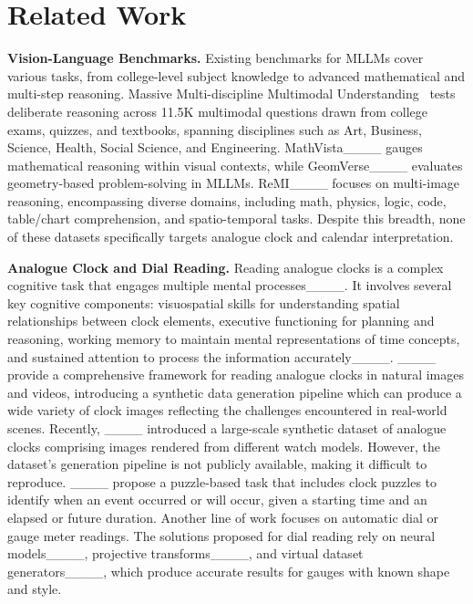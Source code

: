 \section{Related Work}
\label{sec:related}
% 
\textbf{Vision-Language Benchmarks.} Existing benchmarks for MLLMs cover various tasks, from college-level subject knowledge to advanced mathematical and multi-step reasoning.
%
Massive Multi-discipline Multimodal Understanding~\cite[MMMU, ][]{Yue_2024_CVPR} tests deliberate reasoning across 11.5K multimodal questions drawn from college exams, quizzes, and textbooks, spanning disciplines such as Art, Business, Science, Health, Social Science, and Engineering.
%
MathVista____ gauges mathematical reasoning within visual contexts, while GeomVerse____ evaluates geometry-based problem-solving in MLLMs.
%
ReMI____ focuses on multi-image reasoning, encompassing diverse domains, including math, physics, logic, code, table/chart comprehension, and spatio-temporal tasks.
%
Despite this breadth, none of these datasets specifically targets analogue clock and calendar interpretation.
%

\textbf{Analogue Clock and Dial Reading.}
%
Reading analogue clocks is a complex cognitive task that engages multiple mental processes____.
%
It involves several key cognitive components: visuospatial skills for understanding spatial relationships between clock elements, executive functioning for planning and reasoning, working memory to maintain mental representations of time concepts, and sustained attention to process the information accurately____.
%
____ provide a comprehensive framework for reading analogue clocks in natural images and videos, introducing a synthetic data generation pipeline which can produce a wide variety of clock images reflecting the challenges encountered in real-world scenes.
% 
Recently, ____ introduced a large-scale synthetic dataset of analogue clocks comprising images rendered from different watch models.  However, the dataset's generation pipeline is not publicly available, making it difficult to reproduce.
% 
____ propose a puzzle-based task that includes clock puzzles to identify when an event occurred or will occur, given a starting time and an elapsed or future duration. 
%
Another line of work focuses on automatic dial or gauge meter readings.
%
The solutions proposed for dial reading rely on neural models____, projective transforms____, and virtual dataset generators____, which produce accurate results for gauges with known shape and style.
%
%